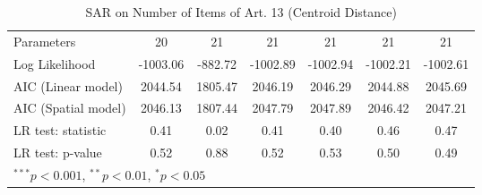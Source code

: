 \begin{table}[!h]
\begin{center}
\begin{tabular}{l c c c c c c }
Parameters              & 20           & 21           & 21           & 21           & 21           & 21           \\
Log Likelihood          & -1003.06     & -882.72      & -1002.89     & -1002.94     & -1002.21     & -1002.61     \\
AIC (Linear model)      & 2044.54      & 1805.47      & 2046.19      & 2046.29      & 2044.88      & 2045.69      \\
AIC (Spatial model)     & 2046.13      & 1807.44      & 2047.79      & 2047.89      & 2046.42      & 2047.21      \\
LR test: statistic      & 0.41         & 0.02         & 0.41         & 0.40         & 0.46         & 0.47         \\
LR test: p-value        & 0.52         & 0.88         & 0.52         & 0.53         & 0.50         & 0.49         \\
\bottomrule
\multicolumn{7}{l}{\scriptsize{$^{***}p<0.001$, $^{**}p<0.01$, $^*p<0.05$}}
\end{tabular}
\caption{SAR on Number of Items of Art. 13 (Centroid Distance)}
\label{table:coefficients}
\end{center}
\end{table}
